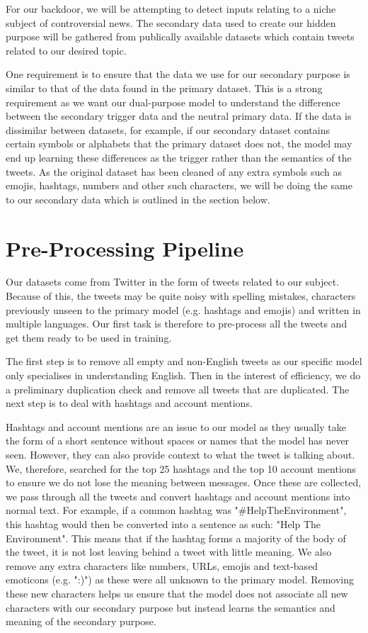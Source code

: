 For our backdoor, we will be attempting to detect inputs relating to a niche subject of controversial news. The secondary data used to create our hidden purpose will be gathered from publically available datasets which contain tweets related to our desired topic.

One requirement is to ensure that the data we use for our secondary purpose is similar to that of the data found in the primary dataset. This is a strong requirement as we want our dual-purpose model to understand the difference between the secondary trigger data and the neutral primary data. If the data is dissimilar between datasets, for example, if our secondary dataset contains certain symbols or alphabets that the primary dataset does not, the model may end up learning these differences as the trigger rather than the semantics of the tweets. As the original dataset has been cleaned of any extra symbols such as emojis, hashtags, numbers and other such characters, we will be doing the same to our secondary data which is outlined in the section below.

\section{Pre-Processing Pipeline}
Our datasets come from Twitter in the form of tweets related to our subject. Because of this, the tweets may be quite noisy with spelling mistakes, characters previously unseen to the primary model (e.g. hashtags and emojis) and written in multiple languages. Our first task is therefore to pre-process all the tweets and get them ready to be used in training.

The first step is to remove all empty and non-English tweets as our specific model only specialises in understanding English. Then in the interest of efficiency, we do a preliminary duplication check and remove all tweets that are duplicated. The next step is to deal with hashtags and account mentions.

Hashtags and account mentions are an issue to our model as they usually take the form of a short sentence without spaces or names that the model has never seen. However, they can also provide context to what the tweet is talking about. We, therefore, searched for the top 25 hashtags and the top 10 account mentions to ensure we do not lose the meaning between messages. Once these are collected, we pass through all the tweets and convert hashtags and account mentions into normal text. For example, if a common hashtag was "\#HelpTheEnvironment", this hashtag would then be converted into a sentence as such: "Help The Environment". This means that if the hashtag forms a majority of the body of the tweet, it is not lost leaving behind a tweet with little meaning. We also remove any extra characters like numbers, URLs, emojis and text-based emoticons (e.g. ":)") as these were all unknown to the primary model. Removing these new characters helps us ensure that the model does not associate all new characters with our secondary purpose but instead learns the semantics and meaning of the secondary purpose.

